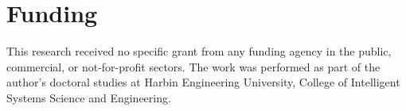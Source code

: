 \documentclass[preprint,12pt,authoryear]{elsarticle}
\begin{document}
\section*{Funding}
This research received no specific grant from any funding agency in the
public, commercial, or not-for-profit sectors. The work was performed as
part of the author's doctoral studies at Harbin Engineering University,
College of Intelligent Systems Science and Engineering.


\end{document}

